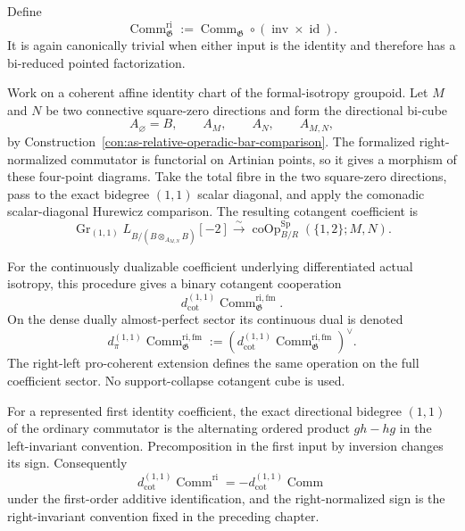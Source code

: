 \begin{definition}
\label{def:as-right-normalized-commutator}
Define
\[
\boxed{
    \operatorname{Comm}_{\mathfrak G}^{\mathrm{ri}}
    :=
    \operatorname{Comm}_{\mathfrak G}
    \circ
    (\operatorname{inv}\times\operatorname{id}).
}
\]
It is again canonically trivial when either input is the identity and
therefore has a bi-reduced pointed factorization.
\end{definition}

\begin{construction}
\label{con:as-mixed-square-zero-commutator}
Work on a coherent affine identity chart of the formal-isotropy groupoid.  Let
$M$ and $N$ be two connective square-zero directions and form the directional
bi-cube
\[
    A_{\varnothing}=B,
    \qquad
    A_M,
    \qquad
    A_N,
    \qquad
    A_{M,N},
\]
by
Construction~\ref{con:as-relative-operadic-bar-comparison}.  The formalized
right-normalized commutator is functorial on Artinian points, so it gives a
morphism of these four-point diagrams.  Take the total fibre in the two
square-zero directions, pass to the exact bidegree $(1,1)$ scalar diagonal,
and apply the comonadic scalar-diagonal Hurewicz comparison.  The resulting
cotangent coefficient is
\[
    \operatorname{Gr}_{(1,1)}
    L_{B/(B\otimes_{A_{M,N}}B)}[-2]
    \xrightarrow{\sim}
    \operatorname{coOp}^{\mathrm{Sp}}_{B/R}
    (\{1,2\};M,N).
\]

For the continuously dualizable coefficient underlying differentiated actual
isotropy, this procedure gives a binary cotangent cooperation
\[
\boxed{
    d_{\mathrm{cot}}^{(1,1)}
    \operatorname{Comm}_{\mathfrak G}^{\mathrm{ri,fm}}.
}
\]
On the dense dually almost-perfect sector its continuous dual is denoted
\[
\boxed{
    d_{\pi}^{(1,1)}
    \operatorname{Comm}_{\mathfrak G}^{\mathrm{ri,fm}}
    :=
    \left(
        d_{\mathrm{cot}}^{(1,1)}
        \operatorname{Comm}_{\mathfrak G}^{\mathrm{ri,fm}}
    \right)^\vee.
}
\]
The right-left pro-coherent extension defines the same operation on the full
coefficient sector.  No support-collapse cotangent cube is used.
\end{construction}

\begin{lemma}
\label{lem:as-commutator-marked-bar}
For a represented first identity coefficient, the exact directional bidegree
$(1,1)$ of the ordinary commutator is the alternating ordered product
$gh-hg$ in the left-invariant convention.  Precomposition in the first input
by inversion changes its sign.  Consequently
\[
\boxed{
    d_{\mathrm{cot}}^{(1,1)}
    \operatorname{Comm}^{\mathrm{ri}}
    =
    -
    d_{\mathrm{cot}}^{(1,1)}
    \operatorname{Comm}
}
\]
under the first-order additive identification, and the right-normalized sign
is the right-invariant convention fixed in the preceding chapter.
\end{lemma}

